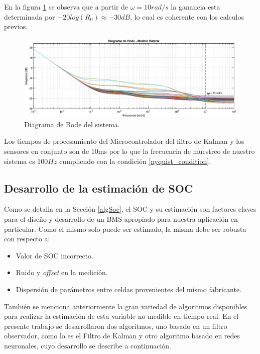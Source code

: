 \documentclass[10pt,a4paper]{article}
\begin{document}
En la figura \ref{system_bode} se observa que a partir de $\omega = 10 rad/s$ la
ganancia esta determinada por $-20log(R_{0})\approx-30dB$, lo cual es coherente
con los calculos previos.

\begin{figure}[h!]
	\begin{center}
		\includegraphics[width=1\textwidth]{bode_amplitud_w_grid.eps}
		\caption{Diagrama de Bode del sistema.}
		\label{system_bode}
	\end{center}
\end{figure}
\FloatBarrier

Los tiempos de procesamiento del Microcontrolador del filtro de Kalman y los
sensores en conjunto son de 10ms por lo que la frecuencia de muestreo de nuestro
sistema es $100 Hz$ cumpliendo con la condición \ref{nyquist_condition}.

\subsection{Desarrollo de la estimaci\'on de \acrshort{SOC}}

Como se detalla en la Secci\'on \ref{algSoc}, el \acrshort{SOC} y su
estimaci\'on son factores claves para el diseño y desarrollo de un
\acrshort{BMS} apropiado para nuestra aplicaci\'on en particular. Como el mismo
solo puede ser estimado, la misma debe ser robusta con respecto a:

\begin{itemize}
    \item Valor de \acrshort{SOC} incorrecto.
    \item Ruido y \emph{offset} en la medici\'on.
    \item Dispersi\'on de par\'ametros entre celdas provenientes del mismo
        fabricante.
\end{itemize}

Tambi\'en se menciona anteriormente la gran variedad de algoritmos disponibles
para realizar la estimaci\'on de esta variable no medible en tiempo real. En el
presente trabajo se desarrollaron dos algoritmos, uno basado en un filtro
observador, como lo es el Filtro de Kalman y otro algoritmo basado en redes
neuronales, cuyo desarrollo se describe a continuaci\'on.
\end{document}
